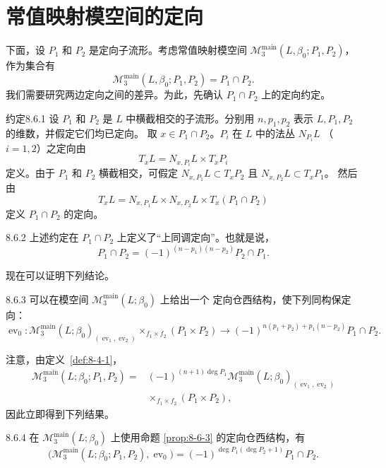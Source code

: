 
\section{常值映射模空间的定向}
\label{sec:8-6}

下面，设 $P_1$ 和 $P_2$ 是定向子流形。考虑常值映射模空间%
$\mathcal M_3^{\mathrm{main}}(L,\beta_0;P_1,P_2)$，作为集合有
\[
 \mathcal M_3^{\mathrm{main}}(L,\beta_0;P_1,P_2)=P_1\cap P_2.
\]
我们需要研究两边定向之间的差异。为此，先确认 $P_1\cap P_2$
上的定向约定。

\begin{statement}{约定}{8.6.1}\label{conv:8-6-1}
设 $P_1$ 和 $P_2$ 是 $L$ 中横截相交的子流形。分别用
$n,p_1,p_2$ 表示 $L,P_1,P_2$ 的维数，并假定它们均已定向。
取 $x\in P_1\cap P_2$。$P_i$ 在 $L$ 中的法丛 $N_{P_i}L$
（$i=1,2$）之定向由
\[
 T_xL=N_{x,P_i}L\times T_xP_i
\]
定义。由于 $P_1$ 和 $P_2$ 横截相交，可假定
$N_{x,P_1}L\subset T_xP_2$ 且 $N_{x,P_2}L\subset T_xP_1$。
然后由
\[
 T_xL=N_{x,P_1}L\times N_{x,P_2}L\times T_x(P_1\cap P_2)
\]
定义 $P_1\cap P_2$ 的定向。
\end{statement}

\begin{remark}{8.6.2}\label{rem:8-6-2}
上述约定在 $P_1\cap P_2$ 上定义了“上同调定向”。也就是说，
\[
 P_1\cap P_2=(-1)^{(n-p_1)(n-p_2)}P_2\cap P_1.
\]
\end{remark}

现在可以证明下列结论。

\begin{proposition}{8.6.3}\label{prop:8-6-3}
可以在模空间 $\mathcal M_3^{\mathrm{main}}(L;\beta_0)$ 上给出一个
定向仓西结构，使下列同构保定向：
\[
 \operatorname{ev}_0\colon
 \mathcal M_3^{\mathrm{main}}(L;\beta_0)_{
  (\operatorname{ev}_1,\operatorname{ev}_2)}
 \mathop{\times}_{f_1\times f_2}(P_1\times P_2)
 \longrightarrow
 (-1)^{n(p_1+p_2)+p_1(n-p_2)}P_1\cap P_2.
\]
\end{proposition}

注意，由定义~\ref{def:8-4-1}，
\[
\begin{aligned}
 \mathcal M_3^{\mathrm{main}}(L;\beta_0;P_1,P_2)
 ={}&(-1)^{(n+1)\deg P_1}
 \mathcal M_3^{\mathrm{main}}(L;\beta_0)_{
  (\operatorname{ev}_1,\operatorname{ev}_2)}\\[-2pt]
 &{}\mathop{\times}_{f_1\times f_2}(P_1\times P_2),
\end{aligned}
\]
因此立即得到下列结果。

\begin{corollary}{8.6.4}\label{cor:8-6-4}
在 $\mathcal M_3^{\mathrm{main}}(L;\beta_0)$ 上使用命题
\ref{prop:8-6-3} 的定向仓西结构，有
\[
 \bigl(\mathcal M_3^{\mathrm{main}}(L;\beta_0;P_1,P_2),
 \operatorname{ev}_0\bigr)
 =(-1)^{\deg P_1(\deg P_2+1)}P_1\cap P_2.
\]
\end{corollary}

